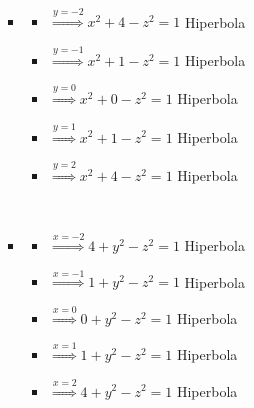 \documentclass[../practica_02.tex]{subfiles}
\begin{document}
\begin{enumerate}
\begin{enumerate}
\begin{itemize}
                            $ $

                        \item
                            \begin{itemize}
                                \item $\stackrel{y=-2}{\Rightarrow} x^2 + 4 - z^2 = 1 $ Hiperbola
                                \item $\stackrel{y=-1}{\Rightarrow} x^2 + 1 - z^2 = 1 $ Hiperbola
                                \item $\stackrel{y=0}{\Rightarrow}  x^2 + 0 - z^2 = 1 $ Hiperbola
                                \item $\stackrel{y=1}{\Rightarrow}  x^2 + 1 - z^2 = 1 $ Hiperbola
                                \item $\stackrel{y=2}{\Rightarrow}  x^2 + 4 - z^2 = 1 $ Hiperbola
                            \end{itemize}

                            $ $

                        \item
                            \begin{itemize}
                                \item $\stackrel{x=-2}{\Rightarrow} 4 + y^2 - z^2 = 1 $ Hiperbola
                                \item $\stackrel{x=-1}{\Rightarrow} 1 + y^2 - z^2 = 1 $ Hiperbola
                                \item $\stackrel{x=0}{\Rightarrow}  0 + y^2 - z^2 = 1 $ Hiperbola
                                \item $\stackrel{x=1}{\Rightarrow}  1 + y^2 - z^2 = 1 $ Hiperbola
                                \item $\stackrel{x=2}{\Rightarrow}  4 + y^2 - z^2 = 1 $ Hiperbola
                            \end{itemize}

                    \end{itemize}


\end{enumerate}
\end{enumerate}
\end{document}
